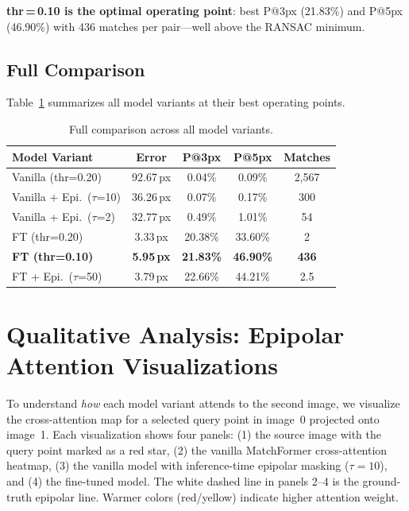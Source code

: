 \documentclass[10pt]{article}
\begin{document}
\textbf{thr\,=\,0.10 is the optimal operating point}: best P@3px (21.83\%) and P@5px (46.90\%) with 436 matches per pair—well above the RANSAC minimum.

\subsection{Full Comparison}

Table~\ref{tab:full} summarizes all model variants at their best operating points.

\begin{table}[H]
\centering
\caption{Full comparison across all model variants.}
\label{tab:full}
\small
\setlength{\tabcolsep}{3.5pt}
\begin{tabular}{lcccc}
\toprule
\textbf{Model Variant} & \textbf{Error} & \textbf{P@3px} & \textbf{P@5px} & \textbf{Matches} \\
\midrule
Vanilla (thr=0.20)          & 92.67\,px & 0.04\%  & 0.09\%  & 2,567 \\
Vanilla + Epi.\ ($\tau$=10) & 36.26\,px & 0.07\%  & 0.17\%  & 300   \\
Vanilla + Epi.\ ($\tau$=2)  & 32.77\,px & 0.49\%  & 1.01\%  & 54    \\
FT (thr=0.20)               & 3.33\,px  & 20.38\% & 33.60\% & 2     \\
\textbf{FT (thr=0.10)}      & \textbf{5.95\,px}  & \textbf{21.83\%} & \textbf{46.90\%} & \textbf{436}   \\
FT + Epi.\ ($\tau$=50)      & 3.79\,px  & 22.66\% & 44.21\% & 2.5   \\
\bottomrule
\end{tabular}
\end{table}

\section{Qualitative Analysis: Epipolar Attention Visualizations}

To understand \emph{how} each model variant attends to the second image, we visualize the cross-attention map for a selected query point in image~0 projected onto image~1. Each visualization shows four panels: (1) the source image with the query point marked as a red star, (2) the vanilla MatchFormer cross-attention heatmap, (3) the vanilla model with inference-time epipolar masking ($\tau=10$), and (4) the fine-tuned model. The white dashed line in panels 2--4 is the ground-truth epipolar line. Warmer colors (red/yellow) indicate higher attention weight.
\end{document}

